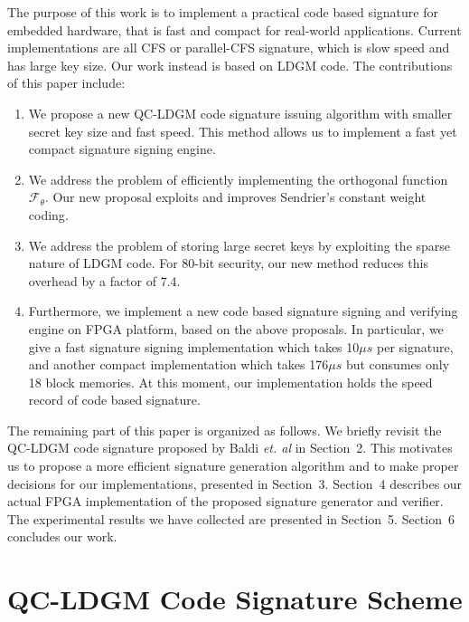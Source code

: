 \documentclass[10pt,journal,compsoc]{IEEEtran}
\begin{document}
The purpose of this work is to implement a practical code based signature for embedded hardware, that is fast and compact for real-world applications. Current implementations are all CFS or parallel-CFS signature, which is slow speed and has large key size. Our work instead is based on LDGM code. The contributions of this paper include:
\begin{enumerate}
	\item We propose a new QC-LDGM code signature issuing algorithm with smaller secret key size and fast speed. This method allows us to implement a fast yet compact signature signing engine.
	\item  We address the problem of efficiently implementing the orthogonal function $\mathcal{F}_\theta$.
	Our new proposal exploits and improves Sendrier's constant weight coding\cite{sendrier2005encoding}.
	\item We address the problem of storing large secret keys by exploiting the sparse nature of LDGM code.
	For 80-bit security, our new method reduces this overhead by a factor of 7.4.
	\item Furthermore, we implement a new code based signature signing and verifying engine on FPGA platform, based on the above proposals. In particular, we give a fast signature signing implementation which takes 10$\mu s$ per signature, and another compact implementation which takes 176$\mu s$ but consumes only 18 block memories. At this moment, our implementation holds the speed record of code based signature.
\end{enumerate}

The remaining part of this paper is organized as follows. We briefly revisit the QC-LDGM code signature proposed by Baldi \textit{et. al}\cite{baldi2013using} in Section~2. This motivates us to propose a more efficient signature generation algorithm and to make proper decisions for our implementations, presented in Section~3. Section~4 describes our actual FPGA implementation of the proposed signature generator and verifier. The experimental results we have collected are presented in Section~5. Section~6 concludes our work.

\section{QC-LDGM Code Signature Scheme}
\end{document}
